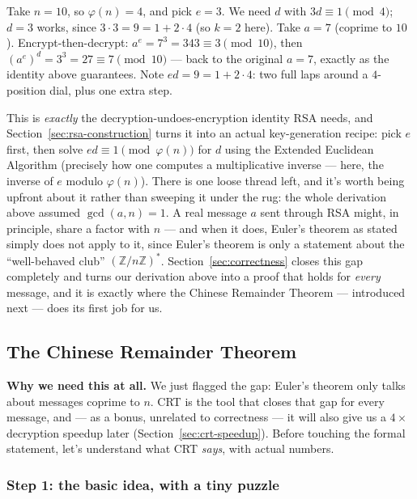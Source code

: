 \begin{example}
Take $n=10$, so $\varphi(n)=4$, and pick $e=3$. We need $d$ with $3d\equiv1\pmod4$; $d=3$ works, since $3\cdot3=9=1+2\cdot4$ (so $k=2$ here). Take $a=7$ (coprime to $10$). Encrypt-then-decrypt: $a^e=7^3=343\equiv3\pmod{10}$, then $(a^e)^d=3^3=27\equiv7\pmod{10}$ — back to the original $a=7$, exactly as the identity above guarantees. Note $ed=9=1+2\cdot4$: two full laps around a $4$-position dial, plus one extra step.
\end{example}

This is \emph{exactly} the decryption-undoes-encryption identity RSA needs, and Section~\ref{sec:rsa-construction} turns it into an actual key-generation recipe: pick $e$ first, then solve $ed\equiv1\pmod{\varphi(n)}$ for $d$ using the Extended Euclidean Algorithm (precisely how one computes a multiplicative inverse — here, the inverse of $e$ modulo $\varphi(n)$). There is one loose thread left, and it's worth being upfront about it rather than sweeping it under the rug: the whole derivation above assumed $\gcd(a,n)=1$. A real message $a$ sent through RSA might, in principle, share a factor with $n$ — and when it does, Euler's theorem as stated simply does not apply to it, since Euler's theorem is only a statement about the ``well-behaved club'' $(\mathbb{Z}/n\mathbb{Z})^*$. Section~\ref{sec:correctness} closes this gap completely and turns our derivation above into a proof that holds for \emph{every} message, and it is exactly where the Chinese Remainder Theorem — introduced next — does its first job for us.

\subsection{The Chinese Remainder Theorem}\label{ssec:crt}

\medskip\noindent\textbf{Why we need this at all.} We just flagged the gap: Euler's theorem only talks about messages coprime to $n$. CRT is the tool that closes that gap for every message, and — as a bonus, unrelated to correctness — it will also give us a $4\times$ decryption speedup later (Section~\ref{sec:crt-speedup}). Before touching the formal statement, let's understand what CRT \emph{says}, with actual numbers.

\subsubsection*{Step 1: the basic idea, with a tiny puzzle}


